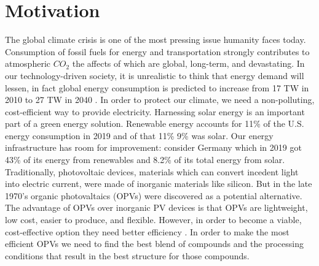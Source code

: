 \section*{Motivation}

The global climate crisis is one of the most pressing issue humanity faces today.
Consumption of fossil fuels for energy and transportation strongly contributes to atmospheric $CO_2$ the affects of which are global, long-term, and devastating\cite{Solomon2009a}.
In our technology-driven society, it is unrealistic to think that energy demand will lessen, in fact global energy consumption is predicted to increase from 17 TW in 2010 to 27 TW in 2040 \cite{Mazzio2015}.
In order to protect our climate, we need a non-polluting, cost-efficient way to provide electricity.
Harnessing solar energy is an important part of a green energy solution.
Renewable energy accounts for 11\% of the U.S. energy consumption in 2019 and of that 11\% 9\% was solar.\cite{https://www.eia.gov/energyexplained/renewable-sources/}
Our energy infrastructure has room for improvement: consider Germany which in 2019 got 43\% of its energy from renewables and 8.2\% of its total energy from solar. \cite{Wirth2017}
Traditionally, photovoltaic devices, materials which can convert incedent light into electric current, were made of inorganic materials like silicon.
But in the late 1970's organic photovaltaics (OPVs) were discovered as a potential alternative.\cite{Tang1986b}
The advantage of OPVs over inorganic PV devices is that OPVs are lightweight, low cost, easier to produce, and flexible. 
However, in order to become a viable, cost-effective option they need better efficiency \cite{Mazzio2015}.
In order to make the most efficient OPVs we need to find the best blend of compounds and the processing conditions that result in the best structure for those compounds.

